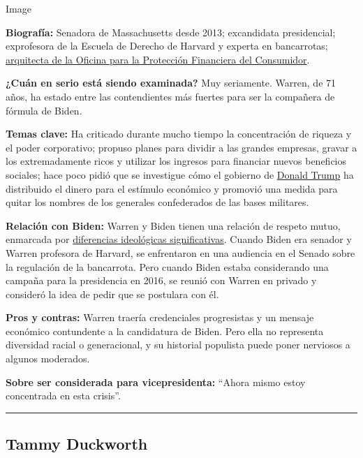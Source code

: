 Image

\textbf{Biografía:} Senadora de Massachusetts desde 2013; excandidata
presidencial; exprofesora de la Escuela de Derecho de Harvard y experta
en bancarrotas;
\href{https://www.nytimes.com/2019/09/21/us/politics/elizabeth-warren.html}{arquitecta
de la Oficina para la Protección Financiera del Consumidor}.

\textbf{¿Cuán en serio está siendo examinada?} Muy seriamente. Warren,
de 71 años, ha estado entre las contendientes más fuertes para ser la
compañera de fórmula de Biden.

\textbf{Temas clave:} Ha criticado durante mucho tiempo la concentración
de riqueza y el poder corporativo; propuso planes para dividir a las
grandes empresas, gravar a los extremadamente ricos y utilizar los
ingresos para financiar nuevos beneficios sociales; hace poco pidió que
se investigue cómo el gobierno de
\href{https://www.nytimes.com/es/interactive/2020/espanol/estados-unidos/donald-trump-elecciones.html}{Donald
Trump} ha distribuido el dinero para el estímulo económico y promovió
una medida para quitar los nombres de los generales confederados de las
bases militares.

\textbf{Relación con Biden:} Warren y Biden tienen una relación de
respeto mutuo, enmarcada por
\href{https://www.nytimes.com/2020/05/22/us/politics/democrats-biden-warren-ticket.html}{diferencias
ideológicas significativas}. Cuando Biden era senador y Warren profesora
de Harvard, se enfrentaron en una audiencia en el Senado sobre la
regulación de la bancarrota. Pero cuando Biden estaba considerando una
campaña para la presidencia en 2016, se reunió con Warren en privado y
consideró la idea de pedir que se postulara con él.

\textbf{Pros y contras:} Warren traería credenciales progresistas y un
mensaje económico contundente a la candidatura de Biden. Pero ella no
representa diversidad racial o generacional, y su historial populista
puede poner nerviosos a algunos moderados.

\textbf{Sobre ser considerada para vicepresidenta:} ``Ahora mismo estoy
concentrada en esta crisis''.

\begin{center}\rule{0.5\linewidth}{\linethickness}\end{center}

\hypertarget{tammy-duckworth}{%
\subsection{Tammy Duckworth}\label{tammy-duckworth}}

